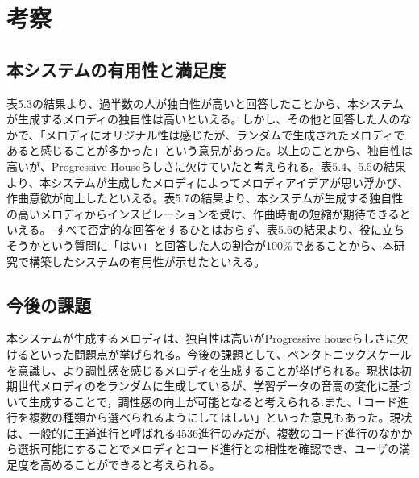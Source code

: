 \chapter{考察}
\section{本システムの有用性と満足度}
表5.3の結果より、過半数の人が独自性が高いと回答したことから、本システムが生成するメロディの独自性は高いといえる。しかし、その他と回答した人のなかで、「メロディにオリジナル性は感じたが、ランダムで生成されたメロディであると感じることが多かった」という意見があった。以上のことから、独自性は高いが、Progressive Houseらしさに欠けていたと考えられる。表5.4、5.5の結果より、本システムが生成したメロディによってメロディアイデアが思い浮かび、作曲意欲が向上したといえる。表5.7の結果より、本システムが生成する独自性の高いメロディからインスピレーションを受け、作曲時間の短縮が期待できるといえる。
すべて否定的な回答をするひとはおらず、表5.6の結果より、役に立ちそうかという質問に「はい」と回答した人の割合が100\%であることから、本研究で構築したシステムの有用性が示せたといえる。
\section{今後の課題}
本システムが生成するメロディは、独自性は高いがProgressive houseらしさに欠けるといった問題点が挙げられる。今後の課題として、ペンタトニックスケールを意識し、より調性感を感じるメロディを生成することが挙げられる。現状は初期世代メロディのをランダムに生成しているが、学習データの音高の変化に基づいて生成することで，調性感の向上が可能となると考えられる.また、「コード進行を複数の種類から選べられるようにしてほしい」といった意見もあった。現状は、一般的に王道進行と呼ばれる4536進行のみだが、複数のコード進行のなかから選択可能にすることでメロディとコード進行との相性を確認でき、ユーザの満足度を高めることができると考えられる。
